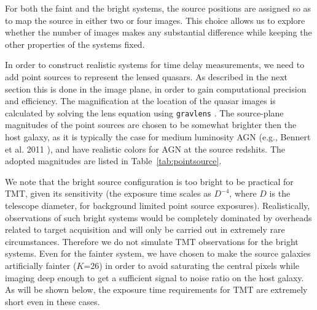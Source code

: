\documentclass[a4paper,11pt]{article}
\begin{document}
For both the faint and the bright systems, the source positions are
assigned so as to map the source in either two or four images. This
choice allows us to explore whether the number of images makes any
substantial difference while keeping the other properties of the
systems fixed.

In order to construct realistic systems for time delay measurements,
we need to add point sources to represent the lensed quasars. As
described in the next section this is done in the image plane, in
order to gain computational precision and efficiency. The
magnification at the location of the quasar images is calculated by
solving the lens equation using \texttt{gravlens}
\cite{2011ascl.soft02003K}. The source-plane magnitudes of the point
sources are chosen to be somewhat brighter then the host galaxy, as it
is typically the case for medium luminosity AGN 
(e.g., Bennert et al. 2011 \cite{2011ApJ...726...59B}), and have realistic colors for AGN at the
source redshits. The adopted magnitudes are listed in
Table~\ref{tab:pointsource}.

We note that the bright source
configuration is too bright to be practical for TMT, given its
sensitivity (the exposure time scales as $D^{-4}$, where $D$ is the
telescope diameter, for background limited point source
exposures). Realistically, observations of such bright systems would
be completely dominated by overheads related to target acquisition and
will only be carried out in extremely rare circumstances. Therefore we
do not simulate TMT observations for the bright systems. Even for the
fainter system, we have chosen to make the source galaxies
artificially fainter ($K$=26) in order to avoid saturating the central
pixels while imaging deep enough to get a sufficient signal to noise
ratio on the host galaxy. As will be shown below, the exposure time
requirements for TMT are extremely short even in these cases.
\end{document}
